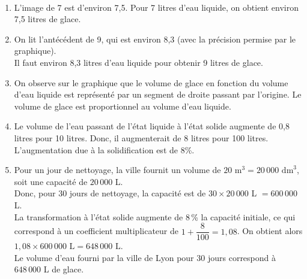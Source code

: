 \begin{corrige}
\ \\ [-5mm]
   \begin{enumerate}
      \item L'image de 7 est d'environ 7,5. {\blue Pour 7 litres d'eau liquide, on obtient environ 7,5 litres de glace.}    
      \item On lit l'antécédent de 9, qui est environ 8,3 (avec la précision permise par le graphique). \\
         {\blue Il faut environ 8,3 litres d'eau liquide pour obtenir 9 litres de glace.}    
      \item On observe sur le graphique que le volume de glace en fonction du volume d'eau liquide est représenté par un segment de droite passant par l'origine. {\blue Le volume de glace est proportionnel au volume d'eau liquide.}    
      \item Le volume de l'eau passant de l'état liquide à l'état solide augmente de 0,8 litres pour 10 litres. Donc, il augmenterait de 8 litres pour 100 litres. {\blue L'augmentation due à la solidification est de 8\%.}  
      \item Pour un jour de nettoyage, la ville fournit un volume de $20 \text{ m}^3 = 20\,000 \text{ dm}^3$, soit une capacité de $20\,000$ L. \\
         Donc, pour 30 jours de nettoyage, la capacité est de $30\times 20\,000$ L $=600\,000$ L. \\
         La transformation à l'état solide augmente de 8\,\% la capacité initiale, ce qui correspond à un coefficient multiplicateur de $1+\dfrac{8}{100} =1,08$. On obtient alors $1,08\times600\,000 \text{ L} = 648\,000 \text{ L}$. \\ [1mm]
         {\blue Le volume d'eau fourni par la ville de Lyon pour $30$ jours correspond à $648\,000$ L de glace.}
   \end{enumerate}
\end{corrige}

\bigskip


